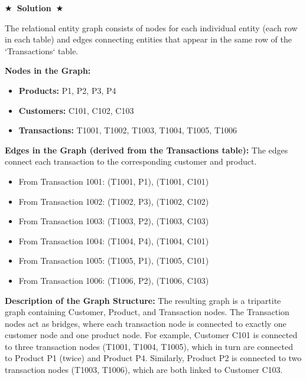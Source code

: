 \documentclass{article}
\numberwithin{figure}{section}
\newcommand{\Solution}[1]{%
    {%
        \medskip
        \color{red}
        \bf $\bigstar$~\sf\textbf{Solution}~$\bigstar$ \sf
        #1
    }
    \bigskip
}
\begin{document}
\Solution{
	The relational entity graph consists of nodes for each individual entity (each row in each table) and edges connecting entities that appear in the same row of the `Transactions` table.
	
	\textbf{Nodes in the Graph:}
	\begin{itemize}
		\item \textbf{Products:} P1, P2, P3, P4
		\item \textbf{Customers:} C101, C102, C103
		\item \textbf{Transactions:} T1001, T1002, T1003, T1004, T1005, T1006
	\end{itemize}
	
	\textbf{Edges in the Graph (derived from the Transactions table):}
	The edges connect each transaction to the corresponding customer and product.
	\begin{itemize}
		\item From Transaction 1001: (T1001, P1), (T1001, C101)
		\item From Transaction 1002: (T1002, P3), (T1002, C102)
		\item From Transaction 1003: (T1003, P2), (T1003, C103)
		\item From Transaction 1004: (T1004, P4), (T1004, C101)
		\item From Transaction 1005: (T1005, P1), (T1005, C101)
		\item From Transaction 1006: (T1006, P2), (T1006, C103)
	\end{itemize}
	
	\textbf{Description of the Graph Structure:}
	The resulting graph is a tripartite graph containing Customer, Product, and Transaction nodes. The Transaction nodes act as bridges, where each transaction node is connected to exactly one customer node and one product node. For example, Customer C101 is connected to three transaction nodes (T1001, T1004, T1005), which in turn are connected to Product P1 (twice) and Product P4. Similarly, Product P2 is connected to two transaction nodes (T1003, T1006), which are both linked to Customer C103.
}
\end{document}
